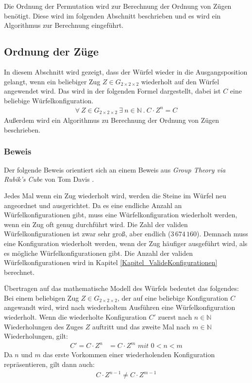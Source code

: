 \documentclass[12pt,a4paper, usenames, dvipsnames]{article}
\theoremstyle{mystyle}
\theoremstyle{definition}
\newcommand{\Gtwo}{\ensuremath{G_{2\times 2\times 2}}}
\begin{document}
Die Ordnung der Permutation wird zur Berechnung der Ordnung von Zügen benötigt. Diese wird im folgenden Abschnitt beschrieben und es wird ein Algorithmus zur Berechnung eingeführt.

%
%
%
%
%
%
%
%
%
%
%
%

\subsection{Ordnung der Züge}
\label{Abschnitt_OrdnungZüge}

In diesem Abschnitt wird gezeigt, dass der Würfel wieder in die Ausgangsposition gelangt, wenn ein beliebiger Zug $Z \in \Gtwo$ wiederholt auf den Würfel angewendet wird. Das wird in der folgenden Formel dargestellt, dabei ist $C$ eine beliebige Würfelkonfiguration.
\begin{align*}
\forall \ Z \in \Gtwo \ \exists \ n \in \mathbb{N} \ . \ C \cdot Z^n = C
\end{align*}
Außerdem wird ein Algorithmus zu Berechnung der Ordnung von Zügen beschrieben.

\subsubsection*{Beweis}

Der folgende Beweis orientiert sich an einem Beweis aus \textit{Group Theory via Rubik's Cube} von Tom Davis \cite{TD}.

Jedes Mal wenn ein Zug wiederholt wird, werden die Steine im Würfel neu angeordnet und ausgerichtet. 
Da es eine endliche Anzahl an Würfelkonfigurationen gibt, muss eine Würfelkonfiguration wiederholt werden, wenn ein Zug oft genug durchführt wird.
Die Zahl der validen Würfelkonfigurationen ist zwar sehr groß, aber endlich ($3 \, 674 \, 160$). Demnach muss eine Konfiguration wiederholt werden, wenn der Zug häufiger ausgeführt wird, als es mögliche Würfelkonfigurationen gibt. Die Anzahl der validen Würfelkonfigurationen wird in Kapitel \ref{Kapitel_ValideKonfigurationen} berechnet.

Übertragen auf das mathematische Modell des Würfels bedeutet das folgendes: Bei einem beliebigen Zug $Z \in \Gtwo$, der auf eine beliebige Konfiguration $C$ angewandt wird, wird nach wiederholtem Ausführen eine Würfelkonfiguration wiederholt. Wenn die wiederholte Konfiguration $C'$ zuerst nach $n \in \mathbb{N}$ Wiederholungen des Zuges $Z$ auftritt und das zweite Mal nach $m \in \mathbb{N}$ Wiederholungen, gilt: 
\begin{align*}
C' = C \cdot Z^n& = C \cdot Z^m \textit{ mit } 0<n<m 
\end{align*}
Da $n$ und $m$ das erste Vorkommen einer wiederholenden Konfiguration repräsentieren, gilt dann auch:
\begin{align*}
C \cdot Z^{n-1} \neq C \cdot Z^{m-1}
\end{align*}
\end{document}
